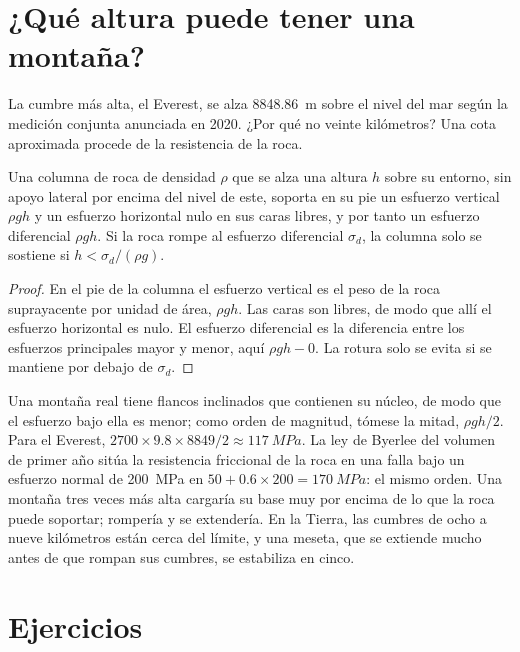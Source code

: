 \section{¿Qué altura puede tener una montaña?}\label{sec:b2:himalaya-andes:heights}

La cumbre más alta, el Everest, se alza \qty{8848.86}{m} sobre el nivel del mar según la medición conjunta
anunciada en 2020. ¿Por qué no veinte kilómetros? Una cota aproximada procede de la resistencia de la roca.

\begin{proposition}\label{prop:b2:himalaya-andes:height}
Una columna de roca de densidad $\rho$ que se alza una altura $h$ sobre su entorno, sin
apoyo lateral por encima del nivel de este, soporta en su pie un esfuerzo vertical $\rho g h$ y un
esfuerzo horizontal nulo en sus caras libres, y por tanto un esfuerzo diferencial $\rho g h$. Si la
roca rompe al esfuerzo diferencial $\sigma_d$, la columna solo se sostiene si $h < \sigma_d/(\rho
g)$.
\end{proposition}

\begin{proof}
En el pie de la columna el esfuerzo vertical es el peso de la roca suprayacente por unidad de área,
$\rho g h$. Las caras son libres, de modo que allí el esfuerzo horizontal es nulo. El esfuerzo diferencial
es la diferencia entre los esfuerzos principales mayor y menor, aquí $\rho g h - 0$.
La rotura solo se evita si se mantiene por debajo de $\sigma_d$.
\end{proof}

Una montaña real tiene flancos inclinados que contienen su núcleo, de modo que el esfuerzo bajo ella es
menor; como orden de magnitud, tómese la mitad, $\rho g h/2$. Para el Everest, $2700 \times 9.8
\times 8849/2 \approx \qty{117}{MPa}$. La ley de Byerlee del volumen de primer año sitúa la resistencia
friccional de la roca en una falla bajo un esfuerzo normal de \qty{200}{MPa} en $50 + 0.6 \times 200 =
\qty{170}{MPa}$: el mismo orden. Una montaña tres veces más alta cargaría su base muy por encima de
lo que la roca puede soportar; rompería y se extendería. En la Tierra, las cumbres de ocho a nueve kilómetros
están cerca del límite, y una meseta, que se extiende mucho antes de que rompan sus cumbres, se estabiliza
en cinco.

\section*{Ejercicios}\label{sec:b2:himalaya-andes:exercises}

